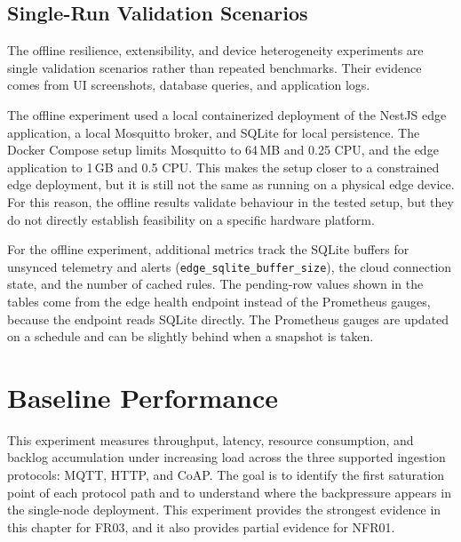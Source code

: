 \subsection{Single-Run Validation Scenarios}
\label{subsec:EvalValidationEvidence}

The offline resilience, extensibility, and device heterogeneity experiments are single validation scenarios rather than repeated benchmarks. Their evidence comes from UI screenshots, database queries, and application logs.

The offline experiment used a local containerized deployment of the NestJS edge application, a local Mosquitto broker, and SQLite for local persistence. The Docker Compose setup limits Mosquitto to 64\,MB and 0.25 CPU, and the edge application to 1\,GB and 0.5 CPU. This makes the setup closer to a constrained edge deployment, but it is still not the same as running on a physical edge device. For this reason, the offline results validate behaviour in the tested setup, but they do not directly establish feasibility on a specific hardware platform.

For the offline experiment, additional metrics track the SQLite buffers for unsynced telemetry and alerts (\texttt{edge\_sqlite\_buffer\_size}), the cloud connection state, and the number of cached rules. The pending-row values shown in the tables come from the edge health endpoint instead of the Prometheus gauges, because the endpoint reads SQLite directly. The Prometheus gauges are updated on a schedule and can be slightly behind when a snapshot is taken.


\section{Baseline Performance}
\label{sec:EvalBaseline}

This experiment measures throughput, latency, resource consumption, and backlog accumulation under increasing load across the three supported ingestion protocols: \gls{MQTT}, \gls{HTTP}, and \gls{CoAP}. The goal is to identify the first saturation point of each protocol path and to understand where the backpressure appears in the single-node deployment. This experiment provides the strongest evidence in this chapter for FR03, and it also provides partial evidence for NFR01.

